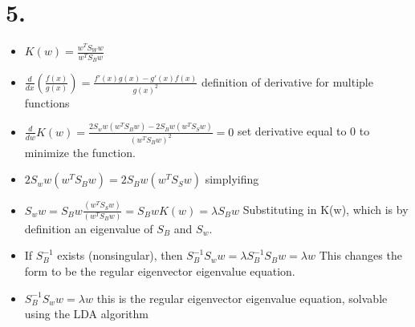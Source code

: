 \documentclass[11pt]{article}
\begin{document}
\section*{5.}
\label{sec:orgb2254b8}
\begin{itemize}
\item \(K(w) = \frac{w^TS_Ww}{w^TS_Bw}\)
\item \(\frac{d}{dx}\left(\frac{f(x)}{g(x)}\right) = \frac{f'(x)g(x) -
  g'(x)f(x)}{g(x)^2}\) definition of derivative for multiple functions
\item \(\frac{d}{dw}K(w) = \frac{2S_ww(w^TS_Bw) -  2S_Bw(w^TS_Sw)}{(w^TS_Bw)^2} =
  0\) set derivative equal to 0 to minimize the function.
\item \(2S_ww(w^TS_Bw) = 2S_Bw(w^TS_Sw)\) simplyifing
\item \(S_ww = S_Bw\frac{(w^TS_Sw)}{(w^TS_Bw)} = S_BwK(w) = \lambda S_Bw\) Substituting in
K(w), which is by definition an eigenvalue of \(S_B\) and \(S_w\).
\item If \(S_B^{-1}\) exists (nonsingular), then \(S_B^{-1}S_ww = \lambda S_B^{-1}S_Bw =
  \lambda w\) This changes the form to be the regular eigenvector eigenvalue equation.
\item \(S_B^{-1}S_ww = \lambda w\) this is the regular eigenvector eigenvalue equation,
solvable using the LDA algorithm
\end{itemize}
\end{document}

